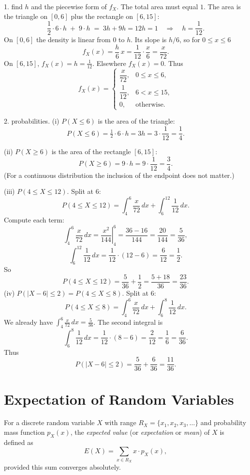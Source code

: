 \begin{solution}
1. find \(h\) and the piecewise form of \(f_X\).
The total area must equal \(1\). The area is the triangle on \([0,6]\) plus the rectangle on \([6,15]\):
\[
\frac{1}{2}\cdot 6\cdot h \;+\; 9\cdot h \;=\; 3h + 9h = 12h = 1
\quad\Longrightarrow\quad h=\frac{1}{12}.
\]
On \([0,6]\) the density is linear from \(0\) to \(h\). Its slope is \(h/6\), so for \(0\le x\le6\)
\[
f_X(x)=\frac{h}{6}\,x=\frac{1}{12}\cdot\frac{x}{6}=\frac{x}{72}.
\]
On \([6,15]\), \(f_X(x)=h=\tfrac{1}{12}\). Elsewhere \(f_X(x)=0\). Thus
\[
f_X(x)=
\begin{cases}
\dfrac{x}{72}, & 0\le x\le 6,\\[6pt]
\dfrac{1}{12}, & 6<x\le 15,\\[4pt]
0, & \text{otherwise.}
\end{cases}
\]

2. probabilities.
(i) \(P(X\le6)\) is the area of the triangle:
\[
P(X\le6)=\tfrac{1}{2}\cdot 6\cdot h=3h=3\cdot\frac{1}{12}=\frac{1}{4}.
\]

(ii) \(P(X\ge6)\) is the area of the rectangle \([6,15]\):
\[
P(X\ge6)=9\cdot h=9\cdot\frac{1}{12}=\frac{3}{4}.
\]
(For a continuous distribution the inclusion of the endpoint does not matter.)

(iii) \(P(4\le X\le12)\). Split at \(6\):
\[
P(4\le X\le12)=\int_{4}^{6}\frac{x}{72}\,dx+\int_{6}^{12}\frac{1}{12}\,dx.
\]
Compute each term:
\[
\int_{4}^{6}\frac{x}{72}\,dx=\left.\frac{x^2}{144}\right|_{4}^{6}=\frac{36-16}{144}=\frac{20}{144}=\frac{5}{36},
\]
\[
\int_{6}^{12}\frac{1}{12}\,dx=\frac{1}{12}\cdot(12-6)=\frac{6}{12}=\frac{1}{2}.
\]
So
\[
P(4\le X\le12)=\frac{5}{36}+\frac{1}{2}=\frac{5+18}{36}=\frac{23}{36}.
\]
(iv) \(P(|X-6|\le2)=P(4\le X\le8)\). Split at \(6\):
\[
P(4\le X\le8)=\int_{4}^{6}\frac{x}{72}\,dx+\int_{6}^{8}\frac{1}{12}\,dx.
\]
We already have \(\int_{4}^{6}\frac{x}{72}\,dx=\frac{5}{36}\). The second integral is
\[
\int_{6}^{8}\frac{1}{12}\,dx=\frac{1}{12}\cdot(8-6)=\frac{2}{12}=\frac{1}{6}=\frac{6}{36}.
\]
Thus
\[
P(|X-6|\le2)=\frac{5}{36}+\frac{6}{36}=\frac{11}{36}.
\]
\end{solution}




\section{Expectation of Random Variables}

\begin{definition}
For a discrete random variable \(X\) with range \(R_X = \{x_1, x_2, x_3, \ldots\}\) and probability mass function \(p_X(x)\), the \emph{expected value} (or \emph{expectation} or \emph{mean}) of \(X\) is defined as
\[
E(X) = \sum_{x \in R_X} x \cdot p_X(x),
\]
provided this sum converges absolutely.
\end{definition}

